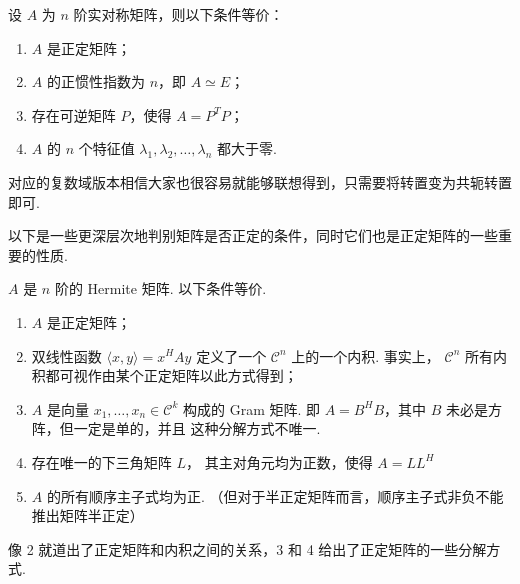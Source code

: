 \begin{theorem}
    设 $ A $ 为 $ n $ 阶实对称矩阵，则以下条件等价：
    \begin{enumerate}
        \item $ A $ 是正定矩阵；
        
        \item $ A $ 的正惯性指数为 $ n $，即 $ A \simeq E $；
        
        \item 存在可逆矩阵 $ P $，使得 $ A = P^{T}P $；
        
        \item $ A $ 的 $ n $ 个特征值 $ \lambda_1, \lambda_2, \ldots, \lambda_n $ 都大于零. 
    \end{enumerate}
\end{theorem}

对应的复数域版本相信大家也很容易就能够联想得到，只需要将转置变为共轭转置即可. 

以下是一些更深层次地判别矩阵是否正定的条件，同时它们也是正定矩阵的一些重要的性质. 

\begin{theorem}
    $ A $ 是 $ n $ 阶的 Hermite 矩阵. 以下条件等价. 
    \begin{enumerate}
        \item $ A $ 是正定矩阵；
        
        \item 双线性函数 $ \langle x, y \rangle = x^{H}Ay $ 
        定义了一个 $ \mathcal{C}^{n} $ 上的一个内积.
        事实上， $ \mathcal{C}^{n} $ 所有内积都可视作由某个正定矩阵以此方式得到；

        \item $ A $ 是向量 $ x_1, \ldots , x_n \in \mathcal{C}^{k} $ 构成的
        Gram 矩阵. 即 $ A = B^{H}B $，其中 $ B $ 未必是方阵，但一定是单的，并且
        这种分解方式不唯一.  
        
        \item {} 存在唯一的下三角矩阵 $ L $，
        其主对角元均为正数，使得 $ A = LL^{H} $

        \item {} $ A $ 的所有顺序主子式均为正.
        （但对于半正定矩阵而言，顺序主子式非负不能推出矩阵半正定）
    \end{enumerate}
\end{theorem} 

像 2 就道出了正定矩阵和内积之间的关系，3 和 4 给出了正定矩阵的一些分解方式. 

